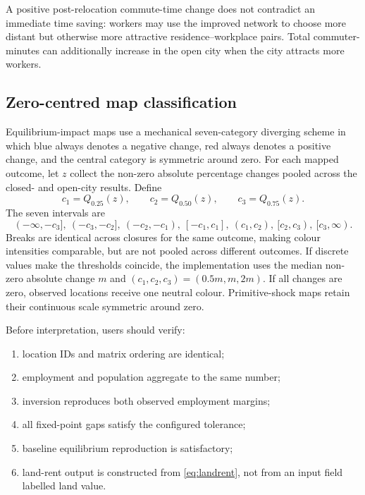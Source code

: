\documentclass[11pt,a4paper]{article}
\begin{document}
A positive post-relocation commute-time change does not contradict an immediate
time saving: workers may use the improved network to choose more distant but
otherwise more attractive residence--workplace pairs. Total commuter-minutes
can additionally increase in the open city when the city attracts more workers.

\subsection{Zero-centred map classification}
Equilibrium-impact maps use a mechanical seven-category diverging scheme in
which blue always denotes a negative change, red always denotes a positive
change, and the central category is symmetric around zero. For each mapped
outcome, let $z$ collect the non-zero absolute percentage changes pooled across
the closed- and open-city results. Define
\begin{equation}
 c_1=Q_{0.25}(z),\qquad c_2=Q_{0.50}(z),\qquad
 c_3=Q_{0.75}(z).                                    \label{eq:mapbreaks}
\end{equation}
The seven intervals are
\begin{equation}
 (-\infty,-c_3],\ (-c_3,-c_2],\ (-c_2,-c_1),\
 [-c_1,c_1],\ (c_1,c_2),\ [c_2,c_3),\ [c_3,\infty).
\end{equation}
Breaks are identical across closures for the same outcome, making colour
intensities comparable, but are not pooled across different outcomes. If
discrete values make the thresholds coincide, the implementation uses the
median non-zero absolute change $m$ and $(c_1,c_2,c_3)=(0.5m,m,2m)$. If all
changes are zero, observed locations receive one neutral colour. Primitive-shock
maps retain their continuous scale symmetric around zero.

Before interpretation, users should verify:
\begin{enumerate}
\item location IDs and matrix ordering are identical;
\item employment and population aggregate to the same number;
\item inversion reproduces both observed employment margins;
\item all fixed-point gaps satisfy the configured tolerance;
\item baseline equilibrium reproduction is satisfactory;
\item land-rent output is constructed from \eqref{eq:landrent}, not from an
input field labelled land value.
\end{enumerate}
\end{document}
